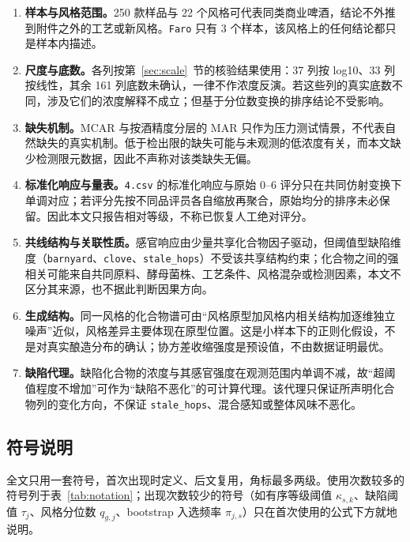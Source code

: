 \documentclass[UTF8,a4paper,zihao=-4]{ctexart}
\numberwithin{figure}{section}
\numberwithin{table}{section}
\numberwithin{equation}{section}
\newcommand{\file}[1]{\texttt{#1}}
\begin{document}
\begin{enumerate}[label=\textbf{\arabic*},leftmargin=3em,itemsep=2pt,topsep=2pt,parsep=0pt]
  \item \textbf{样本与风格范围。}250 款样品与 22 个风格可代表同类商业啤酒，结论不外推到附件之外的工艺或新风格。\file{Faro} 只有 3 个样本，该风格上的任何结论都只是样本内描述。

  \item \textbf{尺度与底数。}各列按第~\ref{sec:scale}~节的核验结果使用：37 列按 log10、33 列按线性，其余 161 列底数未确认，一律不作浓度反演。若这些列的真实底数不同，涉及它们的浓度解释不成立；但基于分位数变换的排序结论不受影响。

  \item \textbf{缺失机制。}MCAR 与按酒精度分层的 MAR 只作为压力测试情景，不代表自然缺失的真实机制。低于检出限的缺失可能与未观测的低浓度有关，而本文缺少检测限元数据，因此不声称对该类缺失无偏。

  \item \textbf{标准化响应与量表。}\file{4.csv} 的标准化响应与原始 0--6 评分只在共同仿射变换下单调对应；若评分先按不同品评员各自缩放再聚合，原始均分的排序未必保留。因此本文只报告相对等级，不称已恢复人工绝对评分。

  \item \textbf{共线结构与关联性质。}感官响应由少量共享化合物因子驱动，但阈值型缺陷维度（\file{barnyard}、\file{clove}、\file{stale\_hops}）不受该共享结构约束；化合物之间的强相关可能来自共同原料、酵母菌株、工艺条件、风格混杂或检测因素，本文不区分其来源，也不据此判断因果方向。

  \item \textbf{生成结构。}同一风格的化合物谱可由“风格原型加风格内相关结构加逐维独立噪声”近似，风格差异主要体现在原型位置。这是小样本下的正则化假设，不是对真实酿造分布的确认；协方差收缩强度是预设值，不由数据证明最优。

  \item \textbf{缺陷代理。}缺陷化合物的浓度与其感官强度在观测范围内单调不减，故“超阈值程度不增加”可作为“缺陷不恶化”的可计算代理。该代理只保证所声明化合物列的变化方向，不保证 \file{stale\_hops}、混合感知或整体风味不恶化。
\end{enumerate}

\subsection{符号说明}

全文只用一套符号，首次出现时定义、后文复用，角标最多两级。使用次数较多的符号列于表~\ref{tab:notation}；出现次数较少的符号（如有序等级阈值 $\kappa_{s,k}$、缺陷阈值 $\tau_j$、风格分位数 $q_{g,j}$、bootstrap 入选频率 $\pi_{j,s}$）只在首次使用的公式下方就地说明。
\end{document}

